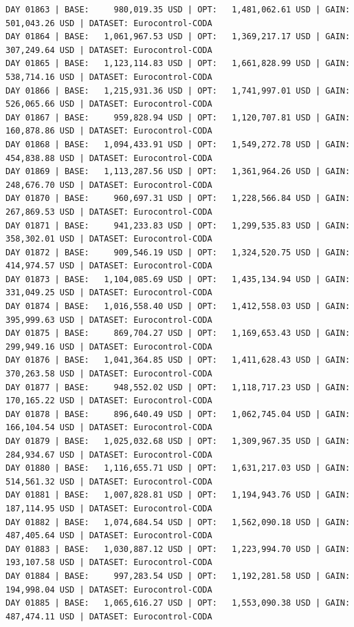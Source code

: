 \documentclass[11pt,a4paper]{article}
\begin{document}
\begin{verbatim}
DAY 01863 | BASE:     980,019.35 USD | OPT:   1,481,062.61 USD | GAIN: 501,043.26 USD | DATASET: Eurocontrol-CODA
DAY 01864 | BASE:   1,061,967.53 USD | OPT:   1,369,217.17 USD | GAIN: 307,249.64 USD | DATASET: Eurocontrol-CODA
DAY 01865 | BASE:   1,123,114.83 USD | OPT:   1,661,828.99 USD | GAIN: 538,714.16 USD | DATASET: Eurocontrol-CODA
DAY 01866 | BASE:   1,215,931.36 USD | OPT:   1,741,997.01 USD | GAIN: 526,065.66 USD | DATASET: Eurocontrol-CODA
DAY 01867 | BASE:     959,828.94 USD | OPT:   1,120,707.81 USD | GAIN: 160,878.86 USD | DATASET: Eurocontrol-CODA
DAY 01868 | BASE:   1,094,433.91 USD | OPT:   1,549,272.78 USD | GAIN: 454,838.88 USD | DATASET: Eurocontrol-CODA
DAY 01869 | BASE:   1,113,287.56 USD | OPT:   1,361,964.26 USD | GAIN: 248,676.70 USD | DATASET: Eurocontrol-CODA
DAY 01870 | BASE:     960,697.31 USD | OPT:   1,228,566.84 USD | GAIN: 267,869.53 USD | DATASET: Eurocontrol-CODA
DAY 01871 | BASE:     941,233.83 USD | OPT:   1,299,535.83 USD | GAIN: 358,302.01 USD | DATASET: Eurocontrol-CODA
DAY 01872 | BASE:     909,546.19 USD | OPT:   1,324,520.75 USD | GAIN: 414,974.57 USD | DATASET: Eurocontrol-CODA
DAY 01873 | BASE:   1,104,085.69 USD | OPT:   1,435,134.94 USD | GAIN: 331,049.25 USD | DATASET: Eurocontrol-CODA
DAY 01874 | BASE:   1,016,558.40 USD | OPT:   1,412,558.03 USD | GAIN: 395,999.63 USD | DATASET: Eurocontrol-CODA
DAY 01875 | BASE:     869,704.27 USD | OPT:   1,169,653.43 USD | GAIN: 299,949.16 USD | DATASET: Eurocontrol-CODA
DAY 01876 | BASE:   1,041,364.85 USD | OPT:   1,411,628.43 USD | GAIN: 370,263.58 USD | DATASET: Eurocontrol-CODA
DAY 01877 | BASE:     948,552.02 USD | OPT:   1,118,717.23 USD | GAIN: 170,165.22 USD | DATASET: Eurocontrol-CODA
DAY 01878 | BASE:     896,640.49 USD | OPT:   1,062,745.04 USD | GAIN: 166,104.54 USD | DATASET: Eurocontrol-CODA
DAY 01879 | BASE:   1,025,032.68 USD | OPT:   1,309,967.35 USD | GAIN: 284,934.67 USD | DATASET: Eurocontrol-CODA
DAY 01880 | BASE:   1,116,655.71 USD | OPT:   1,631,217.03 USD | GAIN: 514,561.32 USD | DATASET: Eurocontrol-CODA
DAY 01881 | BASE:   1,007,828.81 USD | OPT:   1,194,943.76 USD | GAIN: 187,114.95 USD | DATASET: Eurocontrol-CODA
DAY 01882 | BASE:   1,074,684.54 USD | OPT:   1,562,090.18 USD | GAIN: 487,405.64 USD | DATASET: Eurocontrol-CODA
DAY 01883 | BASE:   1,030,887.12 USD | OPT:   1,223,994.70 USD | GAIN: 193,107.58 USD | DATASET: Eurocontrol-CODA
DAY 01884 | BASE:     997,283.54 USD | OPT:   1,192,281.58 USD | GAIN: 194,998.04 USD | DATASET: Eurocontrol-CODA
DAY 01885 | BASE:   1,065,616.27 USD | OPT:   1,553,090.38 USD | GAIN: 487,474.11 USD | DATASET: Eurocontrol-CODA

\end{verbatim}
\end{document}
